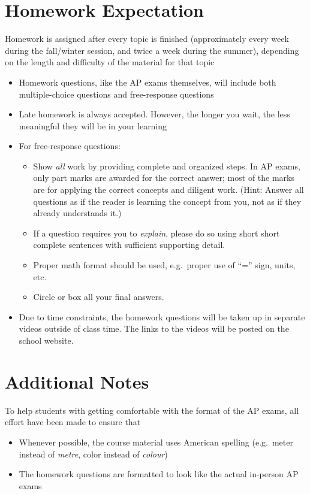 \documentclass{../oss-handout}
\begin{document}
\section*{Homework Expectation}
Homework is assigned after every topic is finished (approximately every
week during the fall/winter session, and twice a week during the summer),
depending on the length and difficulty of the material for that topic
\begin{itemize}[nosep,leftmargin=15pt]
\item Homework questions, like the AP exams themselves, will include both
  multiple-choice questions and free-response questions
\item Late homework is always accepted. However, the longer you wait, the less
  meaningful they will be in your learning
\item For free-response questions:
  \begin{itemize}[nosep,leftmargin=15pt]
  \item Show \emph{all} work by providing complete and organized steps. In AP
    exams, only part marks are awarded for the correct answer; most of the
    marks are for applying the correct concepts and diligent work. (Hint:
    Answer all questions as if the reader is learning the concept from you, not
    as if they already understands it.)
  \item If a question requires you to \emph{explain}, please do so using
    short short complete sentences with sufficient supporting detail.
  \item Proper math format should be used, e.g.\ proper use of ``='' sign,
    units, etc.
  \item Circle or box all your final answers.
  \end{itemize}
\item Due to time constraints, the homework questions will be taken up in
  separate videos outside of class time. The links to the videos will be posted
  on the school website.
\end{itemize}


\section*{Additional Notes}
To help students with getting comfortable with the format of the AP exams, all
effort have been made to ensure that
\begin{itemize}[nosep,leftmargin=15pt]
\item Whenever possible, the course material uses American spelling (e.g.\
  meter instead of \emph{metre}, color instead of \emph{colour})
\item The homework questions are formatted to look like the actual in-person
  AP exams
\end{itemize}
\end{document}
